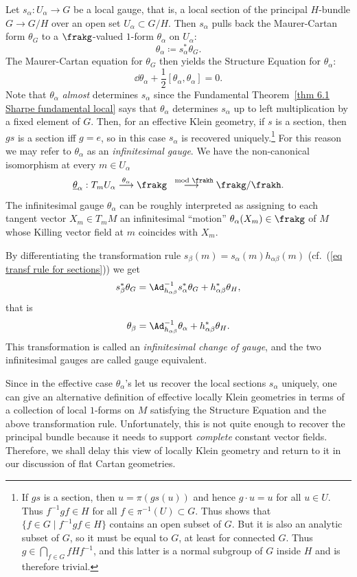 Let $ s_\alpha:U_\alpha\to G$ be a local gauge, that is, a local section of the principal $H$-bundle $G\to G\slash H$ over an open set $U_\alpha\subset G\slash H$. Then $ s_\alpha$ pulls back the Maurer-Cartan form $\theta_G$ to a $\frakg$-valued $1$-form $\theta_\alpha$ on $U_\alpha$: \[\theta_\alpha\coloneqq  s_\alpha^\ast\theta_G.\] 
The Maurer-Cartan equation for $\theta_G$ then yields the Structure Equation for $\theta_\alpha$:
\[\dd\theta_\alpha+\frac 12[\theta_\alpha,\theta_\alpha]=0.\]
Note that $\theta_\alpha$ \emph{almost} determines $ s_\alpha$ since the Fundamental Theorem~\ref{thm 6.1 Sharpe fundamental local} says that $\theta_\alpha$ determines $ s_\alpha$ up to left multiplication by a fixed element of $G$. Then, for an effective Klein geometry, if $ s$ is a section, then $g s$ is a section iff $g=e$, so in this case $ s_\alpha$ is recovered uniquely.\footnote{If $g s$ is a section, then $u=\pi(g s(u))$ and hence $g\cdot u=u$ for all $u\in U$. Thus $f^{-1}gf\in H$ for all $f\in\pi^{-1}(U)\subset G$. Thus shows that $\{f\in G\mid f^{-1}gf\in H\}$ contains an open subset of $G$. But it is also an analytic subset of $G$, so it must be equal to $G$, at least for connected $G$. Thus $g\in \bigcap_{f\in G}fHf^{-1}$, and this latter is a normal subgroup of $G$ inside $H$ and is therefore trivial.} 
For this reason we may refer to $\theta_\alpha$ as an \emph{infinitesimal gauge}. We have the non-canonical isomorphism at every $m\in U_\alpha$
\[\underline{\theta}_\alpha:T_mU_\alpha\overset{\theta_\alpha}{\longrightarrow}\frakg\overset{\mod\frakh}{\longrightarrow} \frakg\slash\frakh.\]
The infinitesimal gauge $\theta_\alpha$ can be roughly interpreted as assigning to each tangent vector $X_m\in T_mM$ an infinitesimal ``motion'' $\theta_\alpha(X_m)\in \frakg$ of $M$ whose Killing vector field at $m$ coincides with $X_m$.

By differentiating the transformation rule $ s_\beta(m)= s_\alpha(m)h_{\alpha\beta}(m)$ (cf.\ (\ref{eq transf rule for sections})) we get
\[ s_\beta^{\ast}\theta_G=\Ad_{h_{\alpha\beta}}^{-1} s_\alpha^\ast\theta_G+h_{\alpha\beta}^\ast\theta_H,\]
that is
\[\theta_\beta=\Ad_{h_{\alpha\beta}}^{-1}\theta_\alpha+h_{\alpha\beta}^\ast\theta_H.\]
This transformation is called an \emph{infinitesimal change of gauge}, and the two infinitesimal gauges are called gauge equivalent.

Since in the effective case $\theta_\alpha$'s let us recover the local sections $s_\alpha$ uniquely, one can give an alternative definition of effective locally Klein geometries in terms of a collection of local $1$-forms on $M$ satisfying the Structure Equation and the above transformation rule. Unfortunately, this is not quite enough to recover the principal bundle because it needs to support \emph{complete} constant vector fields. Therefore, we shall delay this view of locally Klein geometry and return to it in our discussion of flat Cartan geometries. 

